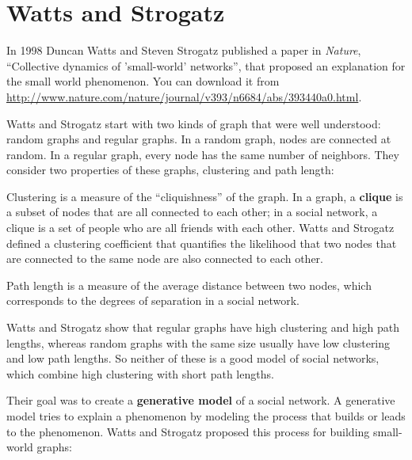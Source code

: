 \documentclass[12pt]{book}
\theoremstyle{exercise}
\begin{document}
\section{Watts and Strogatz}

In 1998 Duncan Watts and Steven Strogatz published a paper in {\em
  Nature}, ``Collective dynamics of 'small-world' networks'', that
proposed an explanation for the small world phenomenon.  You can
download it from
\url{http://www.nature.com/nature/journal/v393/n6684/abs/393440a0.html}.
  

Watts and Strogatz start with two kinds of graph that were well
understood: random graphs and regular graphs.  In a random graph, nodes
are connected at random.  In a regular graph, every node has the
same number of neighbors.
They consider two
properties of these graphs, clustering and path length:

\begin{description}

\item Clustering is a measure of the ``cliquishness'' of the graph.
In a graph, a {\bf clique} is a subset of nodes that are
all connected to each other; in a social network, a clique is
a set of people who are all friends with each other.  Watts and Strogatz
defined a clustering coefficient that quantifies the likelihood
that two nodes that are connected to the same node are also
connected to each other.

\item Path length is a measure of the average distance between
two nodes, which corresponds to the degrees of separation in
a social network.

\end{description}

Watts and Strogatz show that regular graphs
have high clustering and high path lengths, whereas
random graphs with the same size usually have low clustering
and low path lengths.  So neither of these is a good model of
social networks, which combine high clustering with
short path lengths.

Their goal was to create a {\bf generative model} of a social
network.  A generative model tries to explain a phenomenon by
modeling the process that builds or leads to the phenomenon.
Watts and Strogatz proposed this process for building
small-world graphs:
\end{document}
